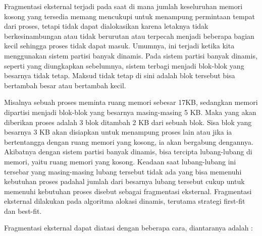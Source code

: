 Fragmentasi eksternal terjadi pada saat di mana jumlah keseluruhan memori kosong yang tersedia memang mencukupi untuk menampung permintaan tempat dari proses, tetapi tidak dapat dialokasikan karena letaknya tidak berkesinambungan atau tidak berurutan atau terpecah menjadi beberapa bagian kecil sehingga proses tidak dapat masuk. 
Umumnya, ini terjadi ketika kita menggunakan sistem partisi banyak dinamis. Pada sistem partisi banyak dinamis, seperti yang diungkapkan sebelumnya, sistem terbagi menjadi blok-blok yang besarnya tidak tetap. Maksud tidak tetap di sini adalah blok tersebut bisa bertambah besar atau bertambah kecil. 

Misalnya sebuah proses meminta ruang memori sebesar 17KB, sedangkan memori dipartisi menjadi blok-blok yang besarnya masing-masing 5 KB. Maka yang akan diberikan proses adalah 3 blok ditambah 2 KB dari sebuah blok. Sisa blok yang besarnya 3 KB akan disiapkan untuk menampung proses lain atau jika ia bertentangga dengan ruang memori yang kosong, ia akan bergabung dengannya. Akibatnya dengan sistem partisi banyak dinamis, bisa tercipta lubang-lubang di memori, yaitu ruang memori yang kosong. Keadaan saat lubang-lubang ini tersebar yang masing-masing lubang tersebut tidak ada yang bisa memenuhi kebutuhan proses padahal jumlah dari besarnya lubang tersebut cukup untuk memenuhi kebutuhan proses disebut sebagai fragmentasi eksternal. Fragmentasi eksternal dilakukan pada algoritma alokasi dinamis, terutama strategi first-fit dan best-fit.

Fragmentasi eksternal dapat diatasi dengan beberapa cara, diantaranya adalah :

